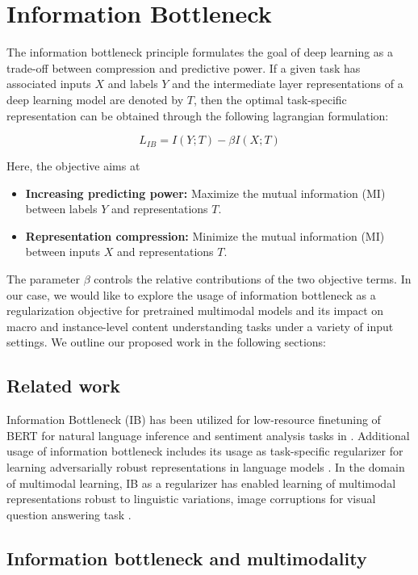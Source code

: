 \section{Information Bottleneck}

The information bottleneck principle \cite{Tishby2015DeepLA} formulates the goal of deep learning as a trade-off between compression and predictive power. If a given task has associated inputs $X$ and labels $Y$ and the intermediate layer representations of a deep learning model are denoted by $T$, then the optimal task-specific representation can be obtained through the following lagrangian formulation:

\begin{equation}
    L_{IB}= I(Y;T) - \beta I(X;T)
\end{equation}

Here, the objective aims at 
\begin{itemize}
    \item \textbf{Increasing predicting power:} Maximize the mutual information (MI) between labels $Y$ and representations $T$. 
    \item \textbf{Representation compression:} Minimize the mutual information (MI) between inputs $X$ and representations $T$.
\end{itemize}
The parameter $\beta$ controls the relative contributions of the two objective terms. In our case, we would like to explore the usage of information bottleneck as a regularization objective for pretrained multimodal models and its impact on macro and instance-level content understanding tasks under a variety of input settings. We outline our proposed work in the following sections:

\subsection{Related work}
Information Bottleneck (IB) has been utilized for low-resource finetuning of BERT for natural language inference and sentiment analysis tasks in \cite{Mahabadi2021VariationalIB}. Additional usage of information bottleneck includes its usage as task-specific regularizer for learning adversarially robust representations in language models \cite{wang2021infobert}. In the domain of multimodal learning, IB as a regularizer has enabled learning of multimodal representations robust to linguistic variations, image corruptions for visual question answering task \cite{Jiang2022CorrelationIB}. 

\subsection{Information bottleneck and multimodality}

